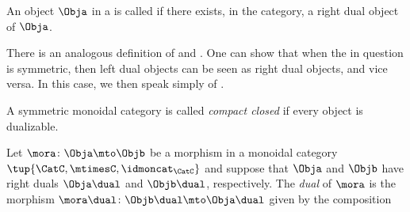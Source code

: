 \begin{definition}\label{def:right-dualizable}
    An object $\Obja$ in a  is called  if there exists, in the category, a right dual object of $\Obja$.
\end{definition}

\begin{remark}\label{rem:left-dualizability}
    There is an analogous definition of  and .
    One can show that when the  in question is symmetric, then left dual objects can be seen as right dual objects, and vice versa.
    In this case, we then speak simply of .
\end{remark}

\begin{ctdefinition}\label{def:compact-closed-category}
A symmetric monoidal category is called \emph{compact closed} if every object is dualizable. 
\end{ctdefinition}


\begin{ctdefinition}\label{def:dual-morphism}
Let $\mora \colon \Obja \mto \Objb$ be a morphism in a monoidal category $\tup{\CatC,\mtimesC,\idmoncat_{\CatC}}$ and suppose that $\Obja$ and $\Objb$ have right duals $\Obja\dual$ and $\Objb\dual$, respectively. The \emph{dual} of $\mora$ is the morphism $\mora\dual \colon \Objb\dual \mto \Obja\dual$ given by the composition

\end{ctdefinition}